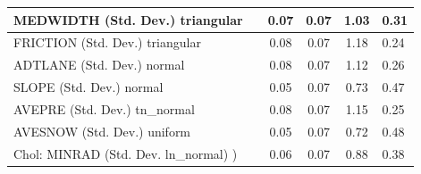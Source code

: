\begin{table}
\begin{center}
\begin{tabular}{|l|l|c|c|c|l|}
			\hline
			MEDWIDTH (Std. Dev.) triangular &  & 0.07 & 0.07 & 1.03 & 0.31 \\
			\hline
			FRICTION (Std. Dev.) triangular &  & 0.08 & 0.07 & 1.18 & 0.24 \\
			\hline
			ADTLANE (Std. Dev.) normal &  & 0.08 & 0.07 & 1.12 & 0.26 \\
			\hline
			SLOPE (Std. Dev.) normal &  & 0.05 & 0.07 & 0.73 & 0.47 \\
			\hline
			AVEPRE (Std. Dev.) tn_normal &  & 0.08 & 0.07 & 1.15 & 0.25 \\
			\hline
			AVESNOW (Std. Dev.) uniform &  & 0.05 & 0.07 & 0.72 & 0.48 \\
			\hline
			 Chol: MINRAD (Std. Dev. ln_normal) ) &  & 0.06 & 0.07 & 0.88 & 0.38 \\
			\hline
		\end{tabular}
	\end{center}
\end{table}